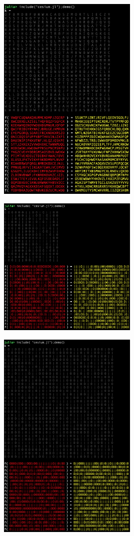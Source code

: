 \documentclass{article}
\begin{document}
{{\includegraphics[width=0.5\textwidth]{1.png}
\begin{figure}[h!]
\end{figure}




\includegraphics[width=0.5\textwidth]{2.png}
\begin{figure}[h!]
\end{figure}


\includegraphics[width=0.5\textwidth]{3.png}
\begin{figure}[h!]
\end{figure}

}}
\end{document}

